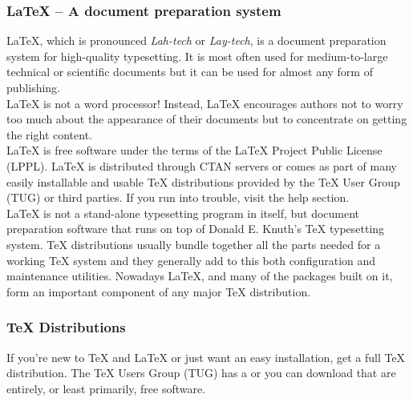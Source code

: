 \documentclass[11pt]{article}
\begin{document}
	\subsubsection*{LaTeX – A document preparation system}
	LaTeX, which is pronounced \textit{Lah-tech} or \textit{Lay-tech}, is a document preparation system for high-quality typesetting. It is most often used for medium-to-large technical or scientific documents but it can be used for almost any form of publishing. \\
	\newline
	LaTeX is not a word processor! Instead, LaTeX encourages authors not to worry too much about the appearance of their documents but to concentrate on getting the right content.\\
	\newline
	LaTeX is free software under the terms of the LaTeX Project Public License (LPPL). LaTeX is distributed through CTAN servers or comes as part of many easily installable and usable TeX distributions provided by the TeX User Group (TUG) or third parties. If you run into trouble, visit the help section.\\
	\newline
	LaTeX is not a stand-alone typesetting program in itself, but document preparation software that runs on top of Donald E. Knuth's TeX typesetting system. TeX distributions usually bundle together all the parts needed for a working TeX system and they generally add to this both configuration and maintenance utilities. Nowadays LaTeX, and many of the packages built on it, form an important component of any major TeX distribution.\\
	
	\subsubsection*{TeX Distributions}
	If you’re new to TeX and LaTeX or just want an easy installation, get a full TeX distribution. The TeX Users Group (TUG) has a \href{http://www.latex-tutorial.com}{\color{blue}{list of notable distributions}} or you can download \href{https://tug.org/texlive/acquire-iso.html}{\color{blue}{TeX Live as an ISO image}} that are entirely, or least primarily, free software. 
		
\end{document}
